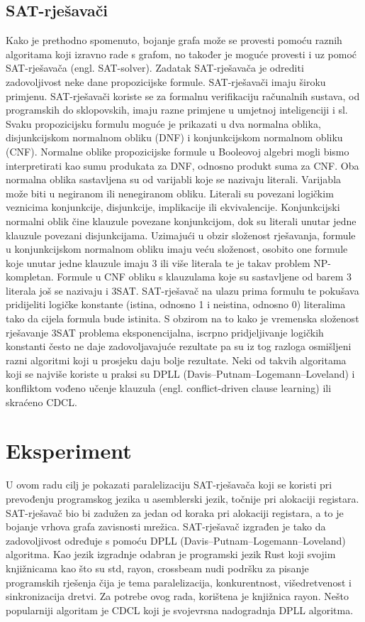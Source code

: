 \documentclass[hidelinks, conference]{IEEEtran}
\begin{document}
\subsection{SAT-rješavači}
Kako je prethodno spomenuto, bojanje grafa može se provesti pomoću raznih algoritama koji izravno rade s grafom, no također je moguće provesti i uz pomoć SAT-rješavača (engl. SAT-solver). Zadatak SAT-rješavača je odrediti zadovoljivost neke dane propozicijske formule. SAT-rješavači imaju široku primjenu. SAT-rješavači koriste se za formalnu verifikaciju računalnih sustava, od programskih do sklopovskih, imaju razne primjene u umjetnoj inteligenciji i sl. Svaku propozicijsku formulu moguće je prikazati u dva normalna oblika, disjunkcijskom normalnom obliku (DNF) i konjunkcijskom normalnom obliku (CNF). Normalne oblike propozicijske formule u Booleovoj algebri mogli bismo interpretirati kao sumu produkata za DNF, odnosno produkt suma za CNF. Oba normalna oblika sastavljena su od varijabli koje se nazivaju literali. Varijabla može biti u negiranom ili nenegiranom obliku. Literali su povezani logičkim veznicima konjunkcije, disjunkcije, implikacije ili ekvivalencije. Konjunkcijski normalni oblik čine klauzule povezane konjunkcijom, dok su literali unutar jedne klauzule povezani disjunkcijama. Uzimajući u obzir složenost rješavanja, formule u konjunkcijskom normalnom obliku imaju veću složenost, osobito one formule koje unutar jedne klauzule imaju 3 ili više literala te je takav problem NP-kompletan. Formule u CNF obliku s klauzulama koje su sastavljene od barem 3 literala još se nazivaju i 3SAT. SAT-rješavač na ulazu prima formulu te pokušava pridijeliti logičke konstante (istina, odnosno 1 i neistina, odnosno 0) literalima tako da cijela formula bude istinita. S obzirom na to kako je vremenska složenost rješavanje 3SAT problema eksponencijalna, iscrpno pridjeljivanje logičkih konstanti često ne daje zadovoljavajuće rezultate pa su iz tog razloga osmišljeni razni algoritmi koji u prosjeku daju bolje rezultate. Neki od takvih algoritama koji se najviše koriste u praksi su DPLL (Davis–Putnam–Logemann–Loveland) i konfliktom vođeno učenje klauzula (engl. conflict-driven clause learning) ili skraćeno CDCL.

\section{Eksperiment}

U ovom radu cilj je pokazati paralelizaciju SAT-rješavača koji se koristi pri prevođenju programskog jezika u asemblerski jezik, točnije pri alokaciji registara. SAT-rješavač bio bi zadužen za jedan od koraka pri alokaciji registara, a to je bojanje vrhova grafa zavisnosti mrežica. SAT-rješavač izgrađen je tako da zadovoljivost određuje s pomoću DPLL (Davis–Putnam–Logemann–Loveland) algoritma. Kao jezik izgradnje odabran je programski jezik Rust koji svojim knjižnicama kao što su std, rayon, crossbeam nudi podršku za pisanje programskih rješenja čija je tema paralelizacija, konkurentnost, višedretvenost i sinkronizacija dretvi. Za potrebe ovog rada, korištena je knjižnica rayon. Nešto popularniji algoritam je CDCL koji je svojevrsna nadogradnja DPLL algoritma.
\end{document}
